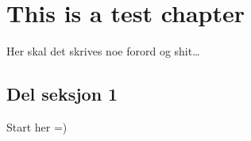 \chapter{This is a test chapter}
Her skal det skrives noe forord og shit\dots

\clearpage
\section{Del seksjon 1}
Start her =)